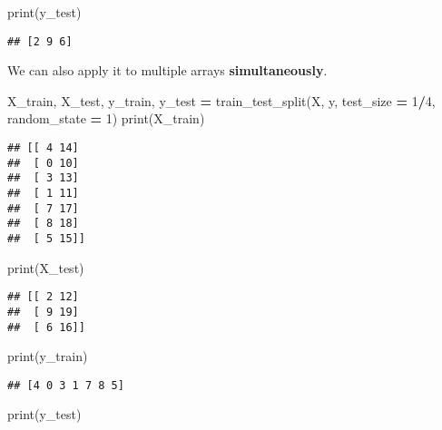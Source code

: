 \documentclass[
]{book}
\newenvironment{Shaded}{\begin{snugshade}}{\end{snugshade}}
\newcommand{\BuiltInTok}[1]{#1}
\newcommand{\DecValTok}[1]{\textcolor[rgb]{0.00,0.00,0.81}{#1}}
\newcommand{\NormalTok}[1]{#1}
\newcommand{\OperatorTok}[1]{\textcolor[rgb]{0.81,0.36,0.00}{\textbf{#1}}}
\begin{document}
\begin{Shaded}
\begin{Highlighting}[]
\BuiltInTok{print}\NormalTok{(y\_test)}
\end{Highlighting}
\end{Shaded}

\begin{verbatim}
## [2 9 6]
\end{verbatim}

We can also apply it to multiple arrays \textbf{simultaneously}.

\begin{Shaded}
\begin{Highlighting}[]
\NormalTok{X\_train, X\_test, y\_train, y\_test }\OperatorTok{=}\NormalTok{ train\_test\_split(X, y, test\_size }\OperatorTok{=} \DecValTok{1}\OperatorTok{/}\DecValTok{4}\NormalTok{, random\_state }\OperatorTok{=} \DecValTok{1}\NormalTok{)}
\BuiltInTok{print}\NormalTok{(X\_train)}
\end{Highlighting}
\end{Shaded}

\begin{verbatim}
## [[ 4 14]
##  [ 0 10]
##  [ 3 13]
##  [ 1 11]
##  [ 7 17]
##  [ 8 18]
##  [ 5 15]]
\end{verbatim}

\begin{Shaded}
\begin{Highlighting}[]
\BuiltInTok{print}\NormalTok{(X\_test)}
\end{Highlighting}
\end{Shaded}

\begin{verbatim}
## [[ 2 12]
##  [ 9 19]
##  [ 6 16]]
\end{verbatim}

\begin{Shaded}
\begin{Highlighting}[]
\BuiltInTok{print}\NormalTok{(y\_train)}
\end{Highlighting}
\end{Shaded}

\begin{verbatim}
## [4 0 3 1 7 8 5]
\end{verbatim}

\begin{Shaded}
\begin{Highlighting}[]
\BuiltInTok{print}\NormalTok{(y\_test)}
\end{Highlighting}
\end{Shaded}
\end{document}
